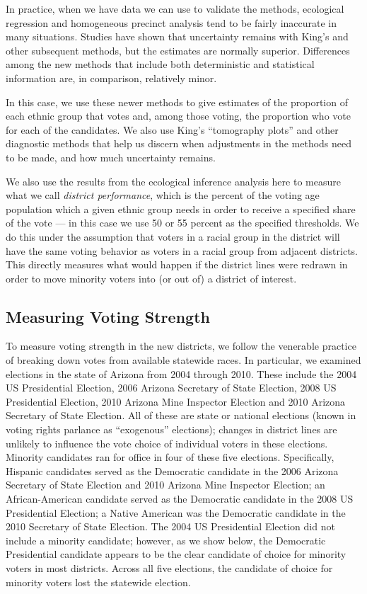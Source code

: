 \documentclass[12pt]{article}
\begin{document}
In practice, when we have data we can use to validate the methods,
ecological regression and homogeneous precinct analysis tend to be
fairly inaccurate in many situations. Studies have shown that
uncertainty remains with King's and other subsequent methods, but the
estimates are normally superior. Differences among the new methods
that include both deterministic and statistical information are, in
comparison, relatively minor.

In this case, we use these newer methods to give estimates of the
proportion of each ethnic group that votes and, among those voting,
the proportion who vote for each of the candidates. We also use King's
``tomography plots'' and other diagnostic methods that help us discern
when adjustments in the methods need to be made, and how much
uncertainty remains.  

We also use the results from the ecological inference analysis here to
measure what we call \emph{district performance}, which is the percent
of the voting age population which a given ethnic group needs in order
to receive a specified share of the vote --- in this case we use 50 or
55 percent as the specified thresholds. We do this under the
assumption that voters in a racial group in the district will have the
same voting behavior as voters in a racial group from adjacent
districts.  This directly measures what would happen if the district
lines were redrawn in order to move minority voters into (or out of) a
district of interest.

\subsection{Measuring Voting Strength}

To measure voting strength in the new districts, we follow the
venerable practice of breaking down votes from available statewide
races.  In particular, we examined elections in the state of Arizona
from 2004 through 2010. These include the 2004 US Presidential
Election, 2006 Arizona Secretary of State Election, 2008 US
Presidential Election, 2010 Arizona Mine Inspector Election and 2010
Arizona Secretary of State Election.  All of these are state or
national elections (known in voting rights parlance as ``exogenous''
elections); changes in district lines are unlikely to influence the
vote choice of individual voters in these elections. Minority
candidates ran for office in four of these five elections.
Specifically, Hispanic candidates served as the Democratic candidate
in the 2006 Arizona Secretary of State Election and 2010 Arizona Mine
Inspector Election; an African-American candidate served as the
Democratic candidate in the 2008 US Presidential Election; a Native
American was the Democratic candidate in the 2010 Secretary of State
Election. The 2004 US Presidential Election did not include a minority
candidate; however, as we show below, the Democratic Presidential
candidate appears to be the clear candidate of choice for minority
voters in most districts. Across all five elections, the candidate of
choice for minority voters lost the statewide election.
\end{document}
